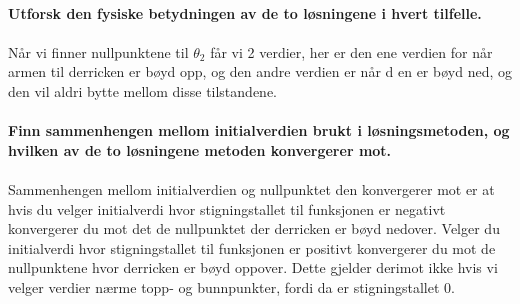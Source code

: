\\
\textbullet \textbf{Utforsk den fysiske betydningen av de to løsningene i hvert tilfelle.\\}
\\
Når vi finner nullpunktene til $\theta_2$ får vi 2 verdier, her er den ene verdien for når armen til derricken er bøyd opp, og den andre verdien er når d en er bøyd ned, og den vil aldri bytte mellom disse tilstandene. 
\\
\\
\newpage
\textbullet \textbf{Finn sammenhengen mellom initialverdien brukt i løsningsmetoden, og hvilken av de to løsningene metoden konvergerer mot.\\}
\\
Sammenhengen mellom initialverdien og nullpunktet den konvergerer mot er at hvis du velger initialverdi hvor stigningstallet til funksjonen er negativt konvergerer du mot det de nullpunktet der derricken er bøyd nedover. Velger du initialverdi hvor stigningstallet til funksjonen er positivt konvergerer du mot de nullpunktene hvor derricken er bøyd oppover. Dette gjelder derimot ikke hvis vi velger verdier nærme topp- og bunnpunkter, fordi da er stigningstallet 0.